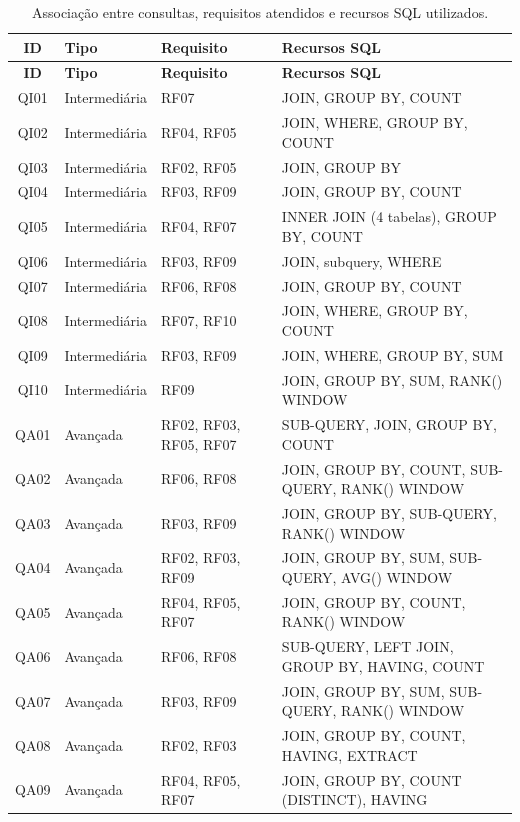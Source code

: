 \documentclass[12pt,a4paper]{article}
\begin{document}
\small
\begin{longtable}{|c|l|l|p{6.5cm}|}
\caption{Associação entre consultas, requisitos atendidos e recursos SQL utilizados.}
\label{tab:consultas-req}\\
\hline
\textbf{ID} & \textbf{Tipo} & \textbf{Requisito} & \textbf{Recursos SQL} \\
\hline
\endfirsthead
\hline
\textbf{ID} & \textbf{Tipo} & \textbf{Requisito} & \textbf{Recursos SQL} \\
\hline
\endhead
QI01 & Intermediária & RF07 & JOIN, GROUP BY, COUNT \\
QI02 & Intermediária & RF04, RF05 & JOIN, WHERE, GROUP BY, COUNT \\
QI03 & Intermediária & RF02, RF05 & JOIN, GROUP BY \\
QI04 & Intermediária & RF03, RF09 & JOIN, GROUP BY, COUNT \\
QI05 & Intermediária & RF04, RF07 & INNER JOIN (4 tabelas), GROUP BY, COUNT \\
QI06 & Intermediária & RF03, RF09 & JOIN, subquery, WHERE \\
QI07 & Intermediária & RF06, RF08 & JOIN, GROUP BY, COUNT \\
QI08 & Intermediária & RF07, RF10 & JOIN, WHERE, GROUP BY, COUNT \\
QI09 & Intermediária & RF03, RF09 & JOIN, WHERE, GROUP BY, SUM \\
QI10 & Intermediária & RF09 & JOIN, GROUP BY, SUM, RANK() WINDOW \\
\hline
QA01 & Avançada & RF02, RF03, RF05, RF07 & SUB-QUERY, JOIN, GROUP BY, COUNT \\
QA02 & Avançada & RF06, RF08 & JOIN, GROUP BY, COUNT, SUB-QUERY, RANK() WINDOW \\
QA03 & Avançada & RF03, RF09 & JOIN, GROUP BY, SUB-QUERY, RANK() WINDOW \\
QA04 & Avançada & RF02, RF03, RF09 & JOIN, GROUP BY, SUM, SUB-QUERY, AVG() WINDOW \\
QA05 & Avançada & RF04, RF05, RF07 & JOIN, GROUP BY, COUNT, RANK() WINDOW \\
QA06 & Avançada & RF06, RF08 & SUB-QUERY, LEFT JOIN, GROUP BY, HAVING, COUNT \\
QA07 & Avançada & RF03, RF09 & JOIN, GROUP BY, SUM, SUB-QUERY, RANK() WINDOW \\
QA08 & Avançada & RF02, RF03 & JOIN, GROUP BY, COUNT, HAVING, EXTRACT \\
QA09 & Avançada & RF04, RF05, RF07 & JOIN, GROUP BY, COUNT (DISTINCT), HAVING \\

\end{longtable}
\end{document}
